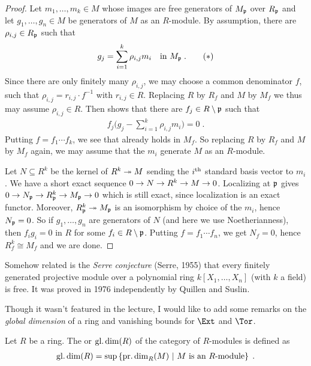 \documentclass[a4paper,parskip=half,numbers=enddot, DIV=12]{scrreprt}
\begin{document}
\begin{proof}
	Let $m_1,\ldots,m_k\in M$ whose images are free generators of $M_{\mathfrak{p}}$ over $R_{\mathfrak{p}}$ and let $g_1,\ldots,g_n\in M$ be generators of $M$ as an $R$-module. By assumption, there are $\rho_{i,j}\in R_{\mathfrak{p}}$ such that
	\begin{align}\lbl{eq:gjInR_p}
		g_j=\sum_{i=1}^k\rho_{i,j}m_i\quad\text{in }M_\pp\;.\tag{$*$}
	\end{align}
	Since there are only finitely many $\rho_{i,j}$, we may choose a common denominator $f$, such that $\rho_{i,j}=r_{i,j}\cdot f^{-1}$ with $r_{i,j}\in R$. Replacing $R$ by $R_f$ and $M$ by $M_f$ we thus may assume $\rho_{i,j}\in R$. Then  shows that there are $f_j\in R\setminus \mathfrak{p}$ such that
	\begin{align*}
		f_j\bigg(g_j-\sum_{i=1}^k\rho_{i,j}m_i\bigg)=0\;.
	\end{align*}
	Putting $f=f_1\cdots f_k$, we see that  already holds in $M_f$. So replacing $R$ by $R_f$ and $M$ by $M_f$ again, we may assume that the $m_i$ generate $M$ as an $R$-module.
	
	Let $N\subseteq R^k$ be the kernel of $R^k\epimorphism M$ sending the $i^{\text{th}}$ standard basis vector to $m_i$. We have a short exact sequence $0\morphism N\morphism R^k\morphism M\morphism 0$. Localizing at $\mathfrak{p}$ gives $0\morphism N_\pp\morphism R_\pp^k\morphism M_\pp\morphism 0$ which is still exact, since localization is an exact functor. Moreover, $R_\pp^k\epimorphism M_\pp$ is an isomorphism by choice of the $m_i$, hence $N_{\mathfrak{p}}=0$. So if $g_1,\ldots,g_n$ are generators of $N$ (and here we use Noetherianness), then $f_ig_i=0$ in $R$ for some $f_i\in R\setminus \mathfrak{p}$. Putting $f=f_1\cdots f_n$, we get $N_f=0$, hence $R_f^k\cong M_f$ and we are done.
\end{proof}
\begin{rem*}
	Somehow related is the \emph{Serre conjecture} (Serre, 1955) that every finitely generated projective module over a polynomial ring $k[X_1,\ldots,X_n]$ (with $k$ a field) is free. It was proved in 1976 independently by Quillen and Suslin.
\end{rem*}
Though it wasn't featured in the lecture, I would like to add some remarks on the \emph{global dimension} of a ring and vanishing bounds for $\Ext$ and $\Tor$.
\begin{defi}
	Let $R$ be a ring. The  or  $\operatorname{gl.dim}(R)$ of the category of $R$-modules is defined as
	\begin{align*}
	\operatorname{gl.dim}(R)=\sup\left\{\operatorname{pr.dim}_R(M)\ \middle|\  M\text{ is an }R\text{-module}\right\}\;.
	\end{align*}
\end{defi}
\end{document}
